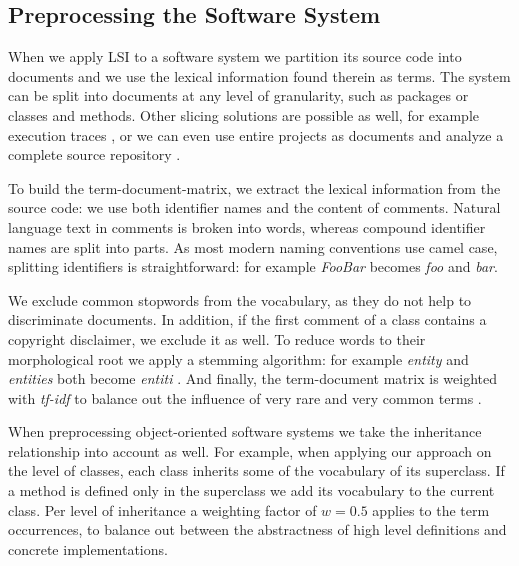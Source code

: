 
\subsection{Preprocessing the Software System}\label{sec:parsing}

When we apply LSI to a software system we partition its source code into documents and we use the lexical information found therein as terms. The system can be split into documents at any level of granularity, such as packages or classes and methods. Other slicing solutions are possible as well, for example execution traces \cite{Kuhn05b}, or we can even use entire projects as documents and analyze a complete source repository \cite{Kawa04a}.

To build the term-document-matrix, we extract the lexical information from the source code: we use both identifier names and the content of comments. Natural language text in comments is broken into words, whereas compound identifier names are split into parts. As most modern naming conventions use camel case, splitting identifiers is straightforward: for example \emph{FooBar} becomes \emph{foo} and \emph{bar}.

We exclude common stopwords from the vocabulary, as they do not help to discriminate documents. In addition, if the first comment of a class contains a copyright disclaimer, we exclude it as well. To reduce words to their morphological root we apply a stemming algorithm: for example \emph{entity} and \emph{entities} both become \emph{entiti} \cite{Port80a}. And finally, the term-document matrix is weighted with \emph{tf-idf} to balance out the influence of very rare and very common terms \cite{Duma91a}.

When preprocessing object-oriented software systems we take the inheritance relationship into account as well. For example, when applying our approach on the level of classes, each class inherits some of the vocabulary of its superclass. If a method is defined only in the superclass we add its vocabulary to the current class. Per level of inheritance a weighting factor of $w = 0.5$ applies to the term occurrences, to balance out between the abstractness of high level definitions and concrete implementations.

